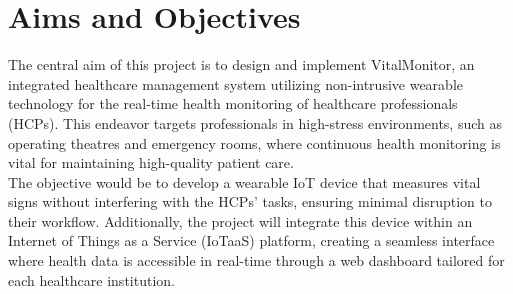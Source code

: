 


\section{Aims and Objectives}

The central aim of this project is to design and implement VitalMonitor, an integrated healthcare management system utilizing non-intrusive wearable technology for the real-time health monitoring of healthcare professionals (HCPs). This endeavor targets professionals in high-stress environments, such as operating theatres and emergency rooms, where continuous health monitoring is vital for maintaining high-quality patient care.\\

\noindent The objective would be to develop a wearable IoT device that measures vital signs without interfering with the HCPs' tasks, ensuring minimal disruption to their workflow. Additionally, the project will integrate this device within an Internet of Things as a Service (IoTaaS) platform, creating a seamless interface where health data is accessible in real-time through a web dashboard tailored for each healthcare institution.\\

